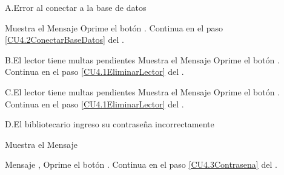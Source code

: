 

		\begin{UCtrayectoriaA}{A.}{Error al conectar a la base de datos}

			\UCpaso Muestra el Mensaje 
			\UCpaso[\UCactor] Oprime el botón .
			\UCpaso Continua en el paso \ref{CU4.2ConectarBaseDatos} del .

		\end{UCtrayectoriaA}	

				
		\begin{UCtrayectoriaA}{B.}{El lector tiene multas pendientes}
			\UCpaso Muestra el Mensaje 
			\UCpaso[\UCactor] Oprime el botón .
			\UCpaso Continua en el paso \ref{CU4.1EliminarLector} del .
			
		\end{UCtrayectoriaA}

				
		\begin{UCtrayectoriaA}{C.}{El lector tiene multas pendientes}
			\UCpaso Muestra el Mensaje 
			\UCpaso[\UCactor] Oprime el botón .
			\UCpaso Continua en el paso \ref{CU4.1EliminarLector} del .
			
		\end{UCtrayectoriaA}

		\begin{UCtrayectoriaA}{D.}{El bibliotecario ingreso su contraseña incorrectamente}

			\UCpaso Muestra el Mensaje \item Mensaje ,
			\UCpaso[\UCactor] Oprime el botón .
			\UCpaso Continua en el paso \ref{CU4.3Contrasena} del .

		\end{UCtrayectoriaA}


